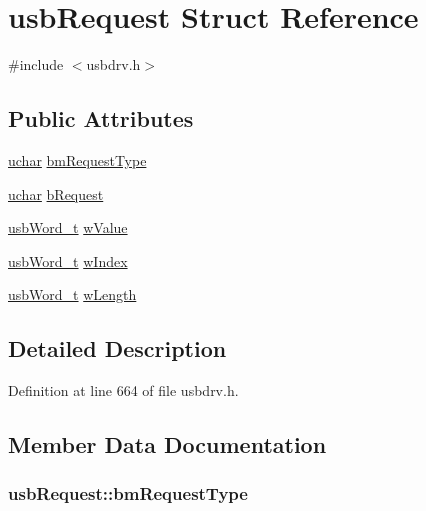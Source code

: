 \hypertarget{structusb_request}{\section{usb\-Request Struct Reference}
\label{structusb_request}
}


{\ttfamily \#include $<$usbdrv.\-h$>$}

\subsection*{Public Attributes}
\begin{DoxyCompactItemize}
\item 
\hyperlink{mhvlib-_vusb-_console_2vusb_2usbdrv_8h_aa8ddf20cdd716b652e76e23e5e700893}{uchar} \hyperlink{structusb_request_a05c2e0d9ac30dce558bcd69a692314c0}{bm\-Request\-Type}
\item 
\hyperlink{mhvlib-_vusb-_console_2vusb_2usbdrv_8h_aa8ddf20cdd716b652e76e23e5e700893}{uchar} \hyperlink{structusb_request_a34c18b1dd0af60774cac48b176220c2c}{b\-Request}
\item 
\hyperlink{mhvlib-_vusb-_keyboard_2vusb_2usbdrv_8h_a992d37ca7c2980c180e963d4f78a30ea}{usb\-Word\-\_\-t} \hyperlink{structusb_request_ab3f8687bb757c53ed03c3ce4310dc5c5}{w\-Value}
\item 
\hyperlink{mhvlib-_vusb-_keyboard_2vusb_2usbdrv_8h_a992d37ca7c2980c180e963d4f78a30ea}{usb\-Word\-\_\-t} \hyperlink{structusb_request_aefa059246bf079d5b42af148a2ad6a95}{w\-Index}
\item 
\hyperlink{mhvlib-_vusb-_keyboard_2vusb_2usbdrv_8h_a992d37ca7c2980c180e963d4f78a30ea}{usb\-Word\-\_\-t} \hyperlink{structusb_request_a770437881c2e37d1384982fe26d87e7f}{w\-Length}
\end{DoxyCompactItemize}


\subsection{Detailed Description}


Definition at line 664 of file usbdrv.\-h.



\subsection{Member Data Documentation}
\hypertarget{structusb_request_a05c2e0d9ac30dce558bcd69a692314c0}{
\subsubsection[{bm\-Request\-Type}]{ usb\-Request\-::bm\-Request\-Type}}\label{structusb_request_a05c2e0d9ac30dce558bcd69a692314c0}


